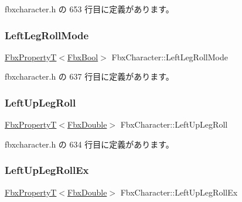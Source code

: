  fbxcharacter.\+h の 653 行目に定義があります。

\mbox{\label{class_fbx_character_a59f7269d313c5482bfcb2fd7daa592c3}} 
\subsubsection{\texorpdfstring{Left\+Leg\+Roll\+Mode}{LeftLegRollMode}}
{\footnotesize\ttfamily \hyperlink{class_fbx_property_t}{Fbx\+PropertyT}$<$\hyperlink{fbxtypes_8h_a92e0562b2fe33e76a242f498b362262e}{Fbx\+Bool}$>$ Fbx\+Character\+::\+Left\+Leg\+Roll\+Mode}



 fbxcharacter.\+h の 637 行目に定義があります。

\mbox{\label{class_fbx_character_a662864f5da2b33658f85ae9826b0e3f0}} 
\subsubsection{\texorpdfstring{Left\+Up\+Leg\+Roll}{LeftUpLegRoll}}
{\footnotesize\ttfamily \hyperlink{class_fbx_property_t}{Fbx\+PropertyT}$<$\hyperlink{fbxtypes_8h_a171e72a1c46fc15c1a6c9c31948c1c5b}{Fbx\+Double}$>$ Fbx\+Character\+::\+Left\+Up\+Leg\+Roll}



 fbxcharacter.\+h の 634 行目に定義があります。

\mbox{\label{class_fbx_character_a8e89a70dc082f417658819afb9dc5299}} 
\subsubsection{\texorpdfstring{Left\+Up\+Leg\+Roll\+Ex}{LeftUpLegRollEx}}
{\footnotesize\ttfamily \hyperlink{class_fbx_property_t}{Fbx\+PropertyT}$<$\hyperlink{fbxtypes_8h_a171e72a1c46fc15c1a6c9c31948c1c5b}{Fbx\+Double}$>$ Fbx\+Character\+::\+Left\+Up\+Leg\+Roll\+Ex}




